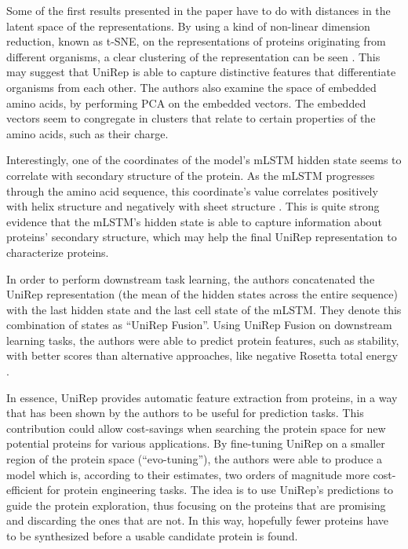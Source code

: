 \documentclass[a4paper,12pt]{article}
\begin{document}
Some of the first results presented in the paper have to do with distances in the latent space of the representations. By using a kind of non-linear dimension reduction, known as t-SNE, on the representations of proteins originating from different organisms, a clear clustering of the representation can be seen \cite[fig. 2b]{alley2019unified}. This may suggest that UniRep is able to capture distinctive features that differentiate organisms from each other. The authors also examine the space of embedded amino acids, by performing PCA on the embedded vectors. The embedded vectors seem to congregate in clusters that relate to certain properties of the amino acids, such as their charge.

Interestingly, one of the coordinates of the model's mLSTM hidden state seems to correlate with secondary structure of the protein. As the mLSTM progresses through the amino acid sequence, this coordinate's value correlates positively with helix structure and negatively with sheet structure \cite[fig. 2e]{alley2019unified}. This is quite strong evidence that the mLSTM's hidden state is able to capture information about proteins' secondary structure, which may help the final UniRep representation to characterize proteins.

In order to perform downstream task learning, the authors concatenated the UniRep representation (the mean of the hidden states across the entire sequence) with the last hidden state and the last cell state of the mLSTM. They denote this combination of states as ``UniRep Fusion''. Using UniRep Fusion on downstream learning tasks, the authors were able to predict protein features, such as stability, with better scores than alternative approaches, like negative Rosetta total energy \cite[fig. 3a]{alley2019unified}.

In essence, UniRep provides automatic feature extraction from proteins, in a way that has been shown by the authors to be useful for prediction tasks. This contribution could allow cost-savings when searching the protein space for new potential proteins for various applications. By fine-tuning UniRep on a smaller region of the protein space (``evo-tuning''), the authors were able to produce a model which is, according to their estimates, two orders of magnitude more cost-efficient for protein engineering tasks. The idea is to use UniRep's predictions to guide the protein exploration, thus focusing on the proteins that are promising and discarding the ones that are not. In this way, hopefully fewer proteins have to be synthesized before a usable candidate protein is found.
\end{document}
